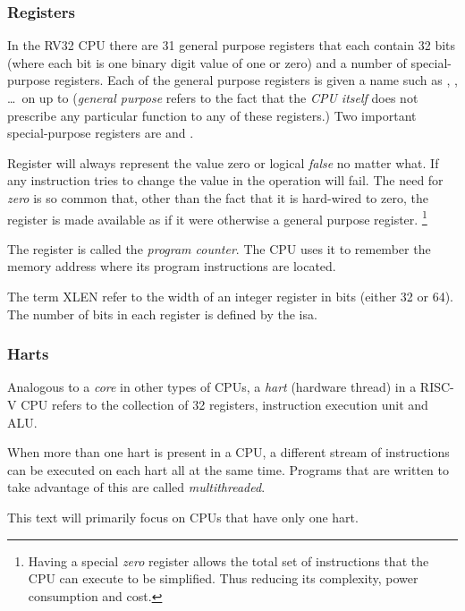 \subsubsection{Registers}

In the RV32 CPU there are 31 general purpose registers that each contain 32 \gls{bit}s 
(where each bit is one \gls{binary} digit value of one or zero) and a number 
of special-purpose registers.
Each of the general purpose registers is given a name such as , ,
\ldots\ on up to  ({\em general purpose} refers to the fact that the 
{\em CPU itself} does not prescribe any particular function to any of these registers.)
Two important special-purpose registers are  and .

Register  will always represent the value zero or logical {\em false}  
no matter what.  If any instruction tries to change the value in  the 
operation will fail.  The need for {\em zero} is so common that, other than the 
fact that it is hard-wired to zero, the  register is made available as 
if it were otherwise a general purpose register.%
\footnote{Having a special 
{\em zero} register allows the total set of instructions that the CPU can execute 
to be simplified.  Thus reducing its complexity, power consumption and cost.} 

The  register is called the {\em program counter}.  The CPU uses it to
remember the memory address where its program instructions are located.

The term XLEN refer to the width of an integer register in bits (either 32 or 64).
The number of bits in each register is defined by the \acrfull{isa}.

\subsubsection{Harts}

Analogous to a {\em core} in other types of CPUs, a {\em \acrshort{hart}} 
(hardware \gls{thread}) in a RISC-V CPU refers to the collection of 32 registers,
instruction execution unit and ALU.\cite[p.~20]{rvismv1v22:2017}

When more than one hart is present in a CPU, a different stream of instructions can 
be executed on each hart all at the same time.
Programs that are written to take advantage of this are called {\em multithreaded}.

This text will primarily focus on CPUs that have only one hart.

